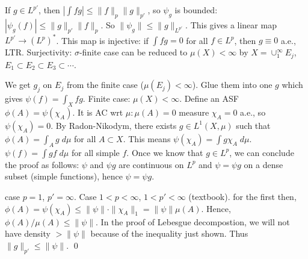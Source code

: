 \pf If $g \in L^{p'}$, then $|\int fg| \leq \|f\|_p \|g\|_{p'}$, so $\psi_g$ is bounded: $|\psi_g(f)| \leq \|g\|_{p'} \|f\|_p$. So $\|\psi_g\| \leq \|g\|_{L^{p'}}$. This gives a linear map $L^{p'} \to (L^p)^*$. This map is injective: if $\int fg=0$ for all $f \in L^p$, then $g \equiv 0$ a.e., LTR. Surjectivity: $\sigma$-finite case can be reduced to $\mu(X)<\infty$ by $X= \cup_1^\infty E_j$, $E_1 \subset E_2 \subset E_3 \subset \cdots$. 


We get $g_j$ on $E_j$ from the finite case ($\mu(E_j)<\infty$). Glue them into one $g$ which gives $\psi(f)= \int_X fg$. Finite case: $\mu(X)< \infty$. Define an ASF $\phi(A)= \psi(\chi_A)$. It is AC wrt $\mu: \mu(A)=0$ measure $\chi_A=0$ a.e., so $\psi(\chi_A)=0$. By Radon-Nikodym, there exists $g \in L^1(X,\mu)$ such that $\phi(A)= \int_A g \; d\mu$ for all $A \subset X$. This means $\psi(\chi_A)= \int g \chi_A \;d\mu$. $\psi(f)= \int gf \; d\mu$ for all simple $f$. Once we know that $g \in L^p$, we can conclude the proof as follows: $\psi$ and $\psi g$ are continuous on $L^p$ and $\psi= \psi g$ on a dense subset (simple functions), hence $\psi = \psi g$. 

case $p=1$, $p'=\infty$. Case $1<p<\infty$, $1<p'<\infty$ (textbook). for the first then, $\phi(A) = \psi(\chi_A) \leq \|\psi\| \cdot \|\chi_A\|_1 = \|\psi\| \mu(A)$. Hence, $\phi(A)/\mu(A) \leq \|\psi\|$. In the proof of Lebesgue decompostion, we will not have density $>\|\psi\|$ because of the inequality just shown. Thus $\|g\|_{p'} \leq \|\psi\|$. \qed \\





































